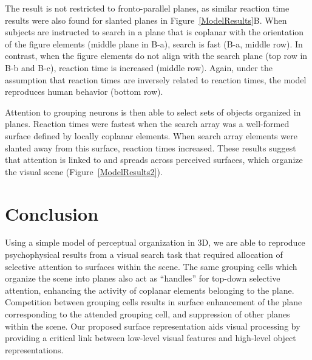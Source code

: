 The result is not restricted to fronto-parallel planes, as similar reaction time results were also found for slanted planes in Figure~\ref{ModelResults}B. When subjects are instructed to search in
a plane that is coplanar with the orientation of the figure elements
(middle plane in B-a), search is fast (B-a, middle row). In contrast,
when the figure elements do not align with the search plane (top row in B-b and B-c), reaction time is increased (middle row). Again, under the assumption that reaction times are inversely related to reaction times, the model reproduces human behavior (bottom row).

Attention to grouping neurons is then able to select sets of objects
organized in planes. Reaction times were fastest when the search array was a well-formed surface defined by locally coplanar elements. When search array elements were slanted away from this surface, reaction times increased. These results suggest that attention is linked to and spreads across perceived surfaces, which organize the visual scene
(Figure~\ref{ModelResults2}). 

\section{Conclusion}
Using a simple model of perceptual organization in 3D,  we are able to reproduce psychophysical results from a visual search task that required allocation of selective attention to surfaces within the scene. The same grouping cells which organize the scene into planes also act as ``handles'' for top-down selective attention, enhancing the activity of coplanar elements belonging to the plane. Competition between grouping cells results in surface enhancement of the plane
corresponding to the attended grouping cell, and suppression of other
planes within the scene. Our proposed surface representation aids visual processing by providing a critical link between low-level
visual features and high-level object representations.